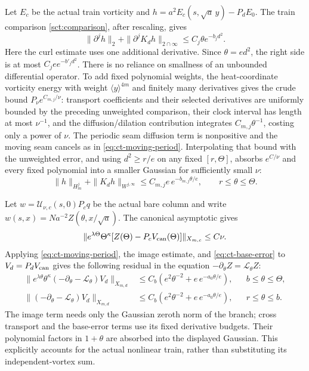 Let $E_c$ be the actual train vorticity and
$h=a^2E_c(s,\sqrt a\,y)-P_dE_0$.
The train comparison \eqref{sct:comparison}, after rescaling, gives
\[
 \|\partial^j h\|_2+
 \|\partial^jK_dh\|_{2\cap\infty}
       \le C_j\theta e^{-b_jd^2}.
\]
Here the curl estimate uses one additional derivative. Since
$\theta=ed^2$, the right side is at most $C_je e^{-b'_jd^2}$.
There is no reliance on smallness of an unbounded differential
operator. To add fixed polynomial weights, the heat-coordinate
vorticity energy with weight $\langle y\rangle^{4m}$ and finitely
many derivatives gives the crude bound $P_\nu e^{C_{m,j}/\nu}$:
transport coefficients and their selected derivatives are uniformly
bounded by the preceding unweighted comparison, their clock interval
has length at most $\nu^{-1}$, and the diffusion/dilation contribution
integrates $C_{m,j}\theta^{-1}$, costing only a power of $\nu$.
The periodic seam diffusion term is nonpositive and the moving seam
cancels as in \eqref{eq:ct-moving-period}. Interpolating that bound
with the unweighted error, and using $d^2\ge r/e$ on any fixed
$[r,\Theta]$, absorbs $e^{C/\nu}$ and every fixed polynomial into
a smaller Gaussian for sufficiently small $\nu$:
\begin{equation}\label{eq:ct-base-error}
 \|h\|_{H_m^j}+\|K_dh\|_{W^{j,\infty}}
       \le C_{m,j}e\,e^{-b_{m,j}\theta/e},
 \qquad r\le\theta\le\Theta.
\end{equation}

Let $w=\mathcal U_{\nu,c}(s,0)P_cq$ be the actual bare column and
write $w(s,x)=Na^{-2}Z(\theta,x/\sqrt a)$.
The canonical asymptotic gives
\[
 \|e^{\lambda\Theta}\Theta^\kappa
       [Z(\Theta)-P_cV_{\rm can}(\Theta)]\|_{X_{m,c}}\le C\nu.
\]
Applying
\eqref{eq:ct-moving-period}, the image estimate, and
\eqref{eq:ct-base-error} to $V_d=P_dV_{\rm can}$ gives the following
residual in the equation $-\partial_\theta Z=\mathcal L_\theta Z$:
\begin{align}
 \|e^{\lambda\theta}\theta^\kappa
       (-\partial_\theta-\mathcal L_\theta)V_d\|_{X_{m,d}}
 &\le C_b(e^2\theta^{-2}+e\,e^{-a_0\theta/e}),
 &&b\le\theta\le\Theta, \label{eq:ct-long-residual}\\
 \|(-\partial_\theta-\mathcal L_\theta)V_d\|_{X_{m,d}}
 &\le C_b(e^2\theta^{-2}+e\,e^{-a_0\theta/e}),
 &&r\le\theta\le b. \label{eq:ct-late-residual}
\end{align}
The image term needs only the Gaussian zeroth norm of the branch;
cross transport and the base-error terms use its fixed derivative
budgets. Their polynomial factors in $1+\theta$ are absorbed into
the displayed Gaussian. This explicitly accounts for the actual
nonlinear train, rather than substituting its independent-vortex sum.

